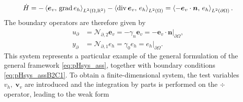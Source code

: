 \begin{equation}
\dot{H} = - \inner[L^2(\Omega, \mathbb{R}^2)]{\bm{e}_v}{\grad e_h} - \inner[L^2(\Omega)]{\div \bm{e}_v}{e_h} = \inner[L^2(\partial\Omega)]{- \bm{e}_v \cdot\bm{n}}{e_h}.
\end{equation}
The boundary operators are therefore given by 
\begin{equation}
\begin{aligned}
u_\partial &= \mathcal{N}_{\partial, 2} \bm{e}_v = -\gamma_{n} \bm{e}_v = -\bm{e}_v \cdot \bm{n}\vert_{\partial\Omega}, \\ 
y_\partial &= \mathcal{N}_{\partial, 1} {e}_h = \gamma_{0} {e}_h = {e}_h\vert_{\partial\Omega}.
\end{aligned}
\end{equation}
This system represents a particular example of the general formulation of the general framework \eqref{eq:pHsys_ass}, together with boundary conditions \eqref{eq:pHsys_assB2C1}. To obtain a finite-dimensional system, the test variables $v_h,\; \bm{v}_v$ are introduced and the integration by parts is performed on the $\div$ operator, leading to the weak form 

